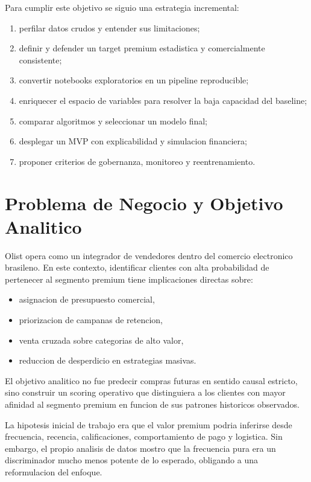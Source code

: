 \documentclass[12pt,letterpaper]{article}
\begin{document}
Para cumplir este objetivo se siguio una estrategia incremental:
\begin{enumerate}[label=\arabic*.]
    \item perfilar datos crudos y entender sus limitaciones;
    \item definir y defender un target premium estadistica y comercialmente consistente;
    \item convertir notebooks exploratorios en un pipeline reproducible;
    \item enriquecer el espacio de variables para resolver la baja capacidad del baseline;
    \item comparar algoritmos y seleccionar un modelo final;
    \item desplegar un MVP con explicabilidad y simulacion financiera;
    \item proponer criterios de gobernanza, monitoreo y reentrenamiento.
\end{enumerate}

\section{Problema de Negocio y Objetivo Analitico}
Olist opera como un integrador de vendedores dentro del comercio electronico brasileno. En este contexto, identificar clientes con alta probabilidad de pertenecer al segmento premium tiene implicaciones directas sobre:
\begin{itemize}
    \item asignacion de presupuesto comercial,
    \item priorizacion de campanas de retencion,
    \item venta cruzada sobre categorias de alto valor,
    \item reduccion de desperdicio en estrategias masivas.
\end{itemize}

El objetivo analitico no fue predecir compras futuras en sentido causal estricto, sino construir un scoring operativo que distinguiera a los clientes con mayor afinidad al segmento premium en funcion de sus patrones historicos observados.

La hipotesis inicial de trabajo era que el valor premium podria inferirse desde frecuencia, recencia, calificaciones, comportamiento de pago y logistica. Sin embargo, el propio analisis de datos mostro que la frecuencia pura era un discriminador mucho menos potente de lo esperado, obligando a una reformulacion del enfoque.
\end{document}
